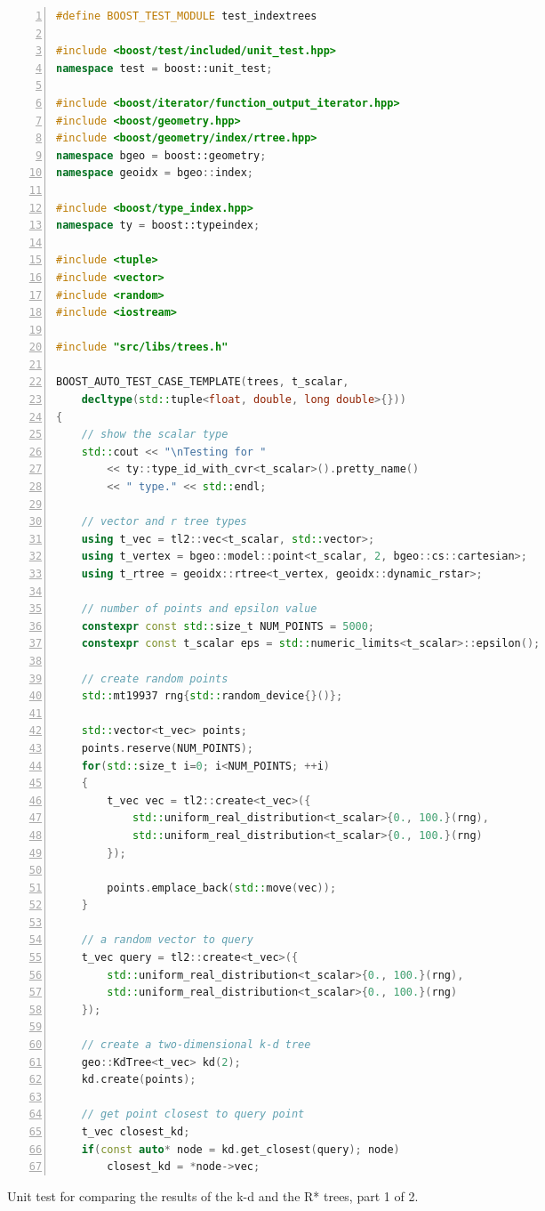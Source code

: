 \begin{listing}[htb]
	\begin{lstlisting}[language = C++,
			basicstyle = {\scriptsize},
			breaklines = true, tabsize = 4,
			numbers = left, numberstyle={\scriptsize}]
#define BOOST_TEST_MODULE test_indextrees

#include <boost/test/included/unit_test.hpp>
namespace test = boost::unit_test;

#include <boost/iterator/function_output_iterator.hpp>
#include <boost/geometry.hpp>
#include <boost/geometry/index/rtree.hpp>
namespace bgeo = boost::geometry;
namespace geoidx = bgeo::index;

#include <boost/type_index.hpp>
namespace ty = boost::typeindex;

#include <tuple>
#include <vector>
#include <random>
#include <iostream>

#include "src/libs/trees.h"

BOOST_AUTO_TEST_CASE_TEMPLATE(trees, t_scalar,
	decltype(std::tuple<float, double, long double>{}))
{
	// show the scalar type
	std::cout << "\nTesting for "
		<< ty::type_id_with_cvr<t_scalar>().pretty_name()
		<< " type." << std::endl;

	// vector and r tree types
	using t_vec = tl2::vec<t_scalar, std::vector>;
	using t_vertex = bgeo::model::point<t_scalar, 2, bgeo::cs::cartesian>;
	using t_rtree = geoidx::rtree<t_vertex, geoidx::dynamic_rstar>;

	// number of points and epsilon value
	constexpr const std::size_t NUM_POINTS = 5000;
	constexpr const t_scalar eps = std::numeric_limits<t_scalar>::epsilon();

	// create random points
	std::mt19937 rng{std::random_device{}()};

	std::vector<t_vec> points;
	points.reserve(NUM_POINTS);
	for(std::size_t i=0; i<NUM_POINTS; ++i)
	{
		t_vec vec = tl2::create<t_vec>({
			std::uniform_real_distribution<t_scalar>{0., 100.}(rng),
			std::uniform_real_distribution<t_scalar>{0., 100.}(rng)
		});

		points.emplace_back(std::move(vec));
	}

	// a random vector to query
	t_vec query = tl2::create<t_vec>({
		std::uniform_real_distribution<t_scalar>{0., 100.}(rng),
		std::uniform_real_distribution<t_scalar>{0., 100.}(rng)
	});

	// create a two-dimensional k-d tree
	geo::KdTree<t_vec> kd(2);
	kd.create(points);

	// get point closest to query point
	t_vec closest_kd;
	if(const auto* node = kd.get_closest(query); node)
		closest_kd = *node->vec;
	\end{lstlisting}
	\caption[Unit test 1/2]{Unit test for comparing the results of the k-d and the R* trees, part 1 of 2.
	\label{lst:unit_test}}
\end{listing}


